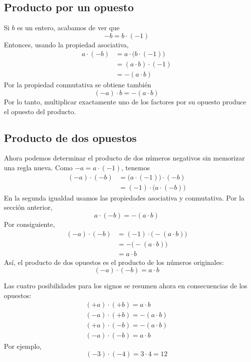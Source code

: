\subsection{Producto por un opuesto}

Si \(b\) es un entero, acabamos de ver que
\[
-b=b\cdot(-1)
\]
Entonces, usando la propiedad asociativa,
\begin{align*}
a\cdot(-b)
&=a\cdot\bigl(b\cdot(-1)\bigr)\\
&=(a\cdot b)\cdot(-1)\\
&=-(a\cdot b)
\end{align*}
Por la propiedad conmutativa se obtiene también
\[
(-a)\cdot b=-(a\cdot b)
\]
Por lo tanto, multiplicar exactamente uno de los factores por su opuesto produce el opuesto del producto.

\subsection{Producto de dos opuestos}

Ahora podemos determinar el producto de dos números negativos sin memorizar una regla nueva. Como \(-a=a\cdot(-1)\), tenemos
\begin{align*}
(-a)\cdot(-b)
&=\bigl(a\cdot(-1)\bigr)\cdot(-b)\\
&=(-1)\cdot\bigl(a\cdot(-b)\bigr)
\end{align*}
En la segunda igualdad usamos las propiedades asociativa y conmutativa. Por la sección anterior,
\[
a\cdot(-b)=-(a\cdot b)
\]
Por consiguiente,
\begin{align*}
(-a)\cdot(-b)
&=(-1)\cdot\bigl(-(a\cdot b)\bigr)\\
&=-\bigl(-(a\cdot b)\bigr)\\
&=a\cdot b
\end{align*}
Así, el producto de dos opuestos es el producto de los números originales:
\[
\boxed{(-a)\cdot(-b)=a\cdot b}
\]

Las cuatro posibilidades para los signos se resumen ahora en consecuencias de los opuestos:
\begin{gather*}
(+a)\cdot(+b)=a\cdot b\\
(-a)\cdot(+b)=-(a\cdot b)\\
(+a)\cdot(-b)=-(a\cdot b)\\
(-a)\cdot(-b)=a\cdot b
\end{gather*}
Por ejemplo,
\[
(-3)\cdot(-4)=3\cdot4=12
\]
